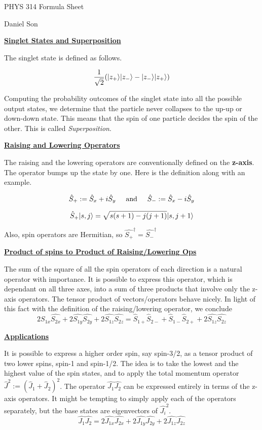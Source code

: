 \documentclass{article}
\DeclarePairedDelimiter\ket{\lvert}{\rangle}
\newcommand{\new}[1]{
    \vspace{2mm}
    \noindent
    \textbf{
    \underline{#1}}
}
\newcommand{\textAnd}{
    {
        \hspace{5mm}
        \textrm{and}
        \hspace{5mm}
    }
}
\begin{document}
\begin{center}
\LARGE
PHYS 314 Formula Sheet

\Large
Daniel Son
\end{center}

\new{Singlet States and Superposition}

The singlet state is defined as follows.

\[
    \frac{1}{\sqrt{2}}
    (\ket{z_+}\ket{z_-} - \ket{z_-} \ket{z_+})
\]

Computing the probability outcomes of the singlet state 
into all the possible output states, we determine that 
the particle never collapses to the up-up or down-down state. 
This means that the spin of one particle decides the spin of the other. 
This is called \textit{Superposition}. 

\new{Raising and Lowering Operators}
The raising and the lowering operators are conventionally 
defined on the \textbf{z-axis}. The operator bumps up 
the state by one. Here is the definition along with an example. 

\[
    \hat{S}_+ := \hat{S}_x + i\hat{S}_y
    \textAnd 
    \hat{S}_- := \hat{S}_x - i\hat{S}_y
\]

\[
    \hat{S}_+ \ket{s, j} = 
    \sqrt{s(s + 1) - j(j + 1)}
    \ket{s, j + 1}
\]

Also, spin operators are Hermitian, so $\hat{S_+}^\dag = \hat{S_-}^\dag$

\new{Product of spins to Product of Raising/Lowering Ops}
The sum of the square of all the spin operators of each direction 
is a natural operator with importance. It is possible to 
express this operator, which is dependant on all three axes, into 
a sum of three products that involve only the z-axis operators. 
The tensor product of vectors/operators behave nicely. In light of 
this fact with the definition of the raising/lowering operator, we 
conclude 
\[
    2\hat{S_{1x}}\hat{S_{2x}}+
    2\hat{S_{1y}}\hat{S_{2y}} + 
    2\hat{S_{1z}}\hat{S_{2z}} = 
    \hat{S}_{1+}\hat{S}_{2-} + \hat{S}_{1-}\hat{S}_{2+} + 2\hat{S_{1z}}\hat{S_{2z}} 
\]

\new{Applications}
It is possible to express a higher order spin, say spin-3/2, as a 
tensor product of two lower spins, spin-1 and spin-1/2. The idea 
is to take the lowest and the highest value of the spin states, 
and to apply the total momentum operator $\hat{J}^2 := (\hat{J}_1 + \hat{J}_2)^2$.
The operator $\hat{J_1}\hat{J_2}$ can be expressed entirely in terms 
of the z-axis operators. It might be tempting to simply apply each 
of the operators separately, but the base states are eigenvectors 
of $\hat{J_i}^2$.  
\[
    \hat{J_1}\hat{J_2} =     2\hat{J_{1x}}\hat{J_{2x}}+
    2\hat{J_{1y}}\hat{J_{2y}} + 
    2\hat{J_{1z}}\hat{J_{2z}} 
\]
\end{document}
